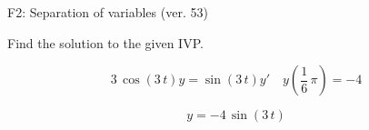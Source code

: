 \begin{exercise}
  \begin{exerciseTitle}F2: Separation of variables (ver. 53)\end{exerciseTitle}
  \begin{exerciseStatement}
    
Find the solution to the given IVP.

    
\[3 \, \cos\left(3 \, t\right) y= \sin\left(3 \, t\right) y'\hspace{1em} y\left( \frac{1}{6} \, \pi \right)= -4\]

  \end{exerciseStatement}
  \begin{exerciseAnswer}
    
\[y= -4 \, \sin\left(3 \, t\right)\]

  \end{exerciseAnswer}
\end{exercise}
